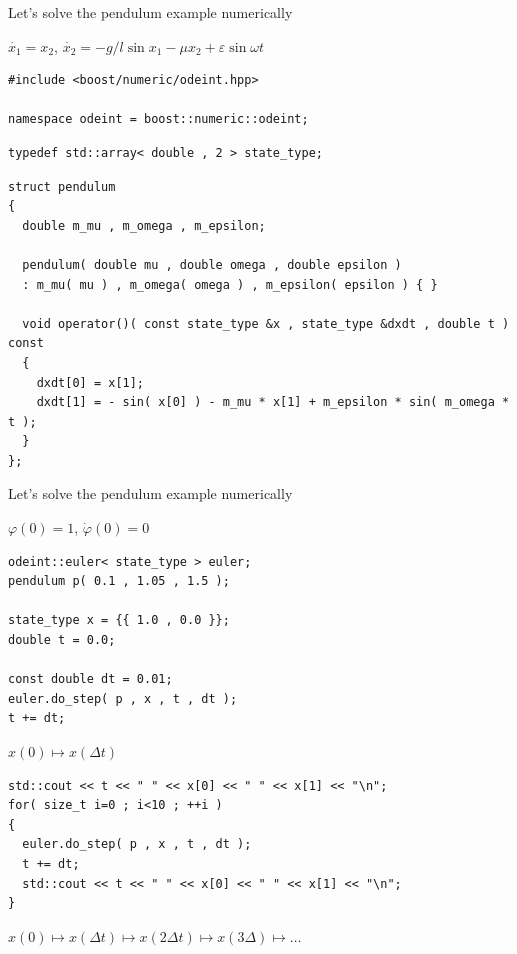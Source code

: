 \begin{frame}[fragile]

\centerline{ \Large Let's solve the pendulum example numerically}
$\dot{x_1} = x_2$, $\dot{x_2} = - g / l \sin x_1 - \mu x_2 + \varepsilon \sin \omega t$

\begin{lstlisting}
#include <boost/numeric/odeint.hpp>

namespace odeint = boost::numeric::odeint;
\end{lstlisting}

\begin{lstlisting}
typedef std::array< double , 2 > state_type;
\end{lstlisting}

\begin{lstlisting}
struct pendulum
{
  double m_mu , m_omega , m_epsilon;

  pendulum( double mu , double omega , double epsilon )
  : m_mu( mu ) , m_omega( omega ) , m_epsilon( epsilon ) { }

  void operator()( const state_type &x , state_type &dxdt , double t ) const
  {
    dxdt[0] = x[1];
    dxdt[1] = - sin( x[0] ) - m_mu * x[1] + m_epsilon * sin( m_omega * t );
  }
};
\end{lstlisting}

\end{frame}

\begin{frame}[fragile]
 \centerline{ \Large Let's solve the pendulum example numerically}

$\varphi(0) = 1$, $\dot{\varphi}(0) = 0$

\begin{lstlisting}
odeint::euler< state_type > euler;
pendulum p( 0.1 , 1.05 , 1.5 );

state_type x = {{ 1.0 , 0.0 }};
double t = 0.0;

const double dt = 0.01;
euler.do_step( p , x , t , dt );
t += dt;
\end{lstlisting}

$x(0) \mapsto x(\Delta t)$

\begin{lstlisting}
std::cout << t << " " << x[0] << " " << x[1] << "\n";
for( size_t i=0 ; i<10 ; ++i )
{
  euler.do_step( p , x , t , dt );
  t += dt;
  std::cout << t << " " << x[0] << " " << x[1] << "\n";
}
\end{lstlisting}

$x(0) \mapsto x(\Delta t) \mapsto x(2\Delta t) \mapsto x(3\Delta) \mapsto \dots$

\end{frame}


